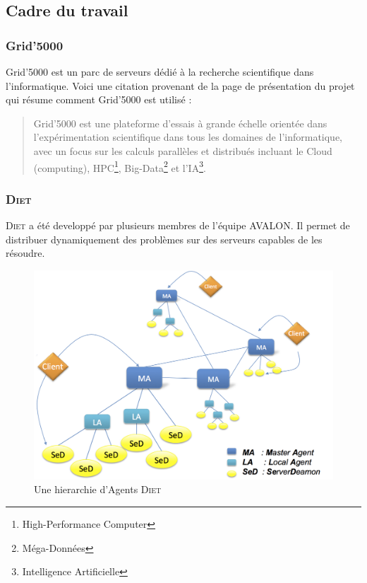 \documentclass{article}
\newcommand{\cloud}{Cloud\xspace}
\newcommand{\avalon}{AVALON\xspace}
\newcommand{\diet}{\textsc{Diet}\xspace} %
\newcommand{\gfivek}{Grid'5000\xspace}
\begin{document}
\subsection{Cadre du travail}


\subsubsection{\gfivek}
\gfivek est un parc de serveurs dédié à la recherche scientifique dans
l'informatique. Voici une citation provenant de la page de présentation du
projet qui résume comment \gfivek est utilisé :
\begin{quotation}
	\og \gfivek est une plateforme d'essais à grande échelle orientée dans
	l'expérimentation scientifique dans tous les domaines de l'informatique, avec
	un focus sur les calculs parallèles et distribués incluant le \cloud
	(computing), HPC\footnote{High-Performance Computer}, Big-Data\footnote{\og
	Méga-Données \fg} et l'IA\footnote{Intelligence Artificielle}. \fg
\end{quotation}

\subsubsection{\diet}\label{diet_section}
\diet\cite{papier_diet} a été developpé par plusieurs membres de l'équipe
\avalon. Il permet de distribuer dynamiquement des problèmes sur des serveurs
capables de les résoudre.

\begin{figure}[h!]
\centering
	\includegraphics[scale=0.5]{../doc/diet_schema.png}
\caption{Une hierarchie d'Agents \diet}
\label{fig:diet_schema}
\end{figure}
\end{document}
